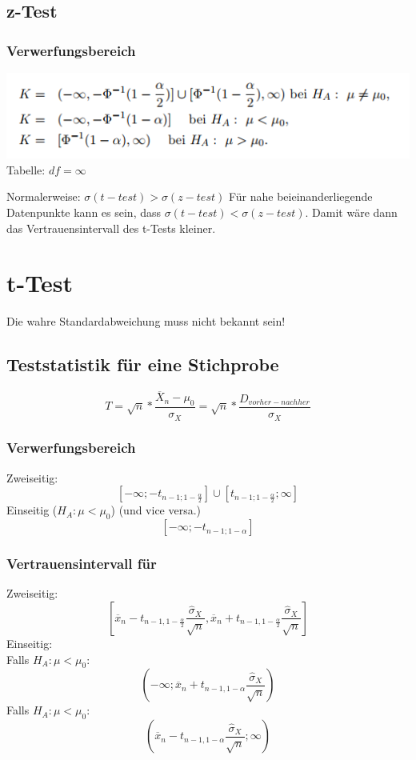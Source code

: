\documentclass{article}
\begin{document}
\begin{multicols*}{3}
      \subsection{z-Test}
      \subsubsection{Verwerfungsbereich}
      \includegraphics[scale=0.4, angle=0]{z-verwerf}
      \\Tabelle: $df = \infty$

      Normalerweise: $\sigma(t-test) > \sigma(z-test)$
      Für nahe beieinanderliegende Datenpunkte kann es sein, dass
      $\sigma(t-test) < \sigma(z-test)$. Damit wäre dann das Vertrauensintervall des t-Tests kleiner.
      \section{t-Test}

      Die wahre Standardabweichung muss nicht bekannt sein!
      \subsection{Teststatistik für eine Stichprobe}

      $$T=\sqrt{n}*\frac{\overline{X}_n-\mu_0}{\sigma_X}=\sqrt{n}*\frac{D_{vorher-nachher}}{\sigma_X}$$

      \subsubsection{Verwerfungsbereich}
      Zweiseitig:
      $$[-\infty;-t_{n-1;1-\frac{\alpha}{2}}]\cup [t_{n-1;1-\frac{\alpha}{2}};\infty]$$
      Einseitig ($H_A:\mu<\mu_0$) (und vice versa.)
      $$[-\infty;-t_{n-1;1-\alpha}]$$

      \subsubsection{Vertrauensintervall für \mu}
      Zweiseitig:
      $$[\overline{x} _n -t_{n-1,1-\frac{\alpha}{2}} \frac{\hat{\sigma}_X}{\sqrt{n}},\overline{x} _n +t_{n-1,1-\frac{\alpha}{2}} \frac{\hat{\sigma} _X}{\sqrt{n}}]$$
      Einseitig: \\
      Falls $H_A:\mu < \mu _0:$
      $$(-\infty; \overline{x} _n + t_{n-1,1-\alpha} \frac{\hat{\sigma}_X}{\sqrt{n}})$$
      Falls $H_A:\mu < \mu _0:$
      $$(\overline{x} _n - t_{n-1,1-\alpha} \frac{\hat{\sigma}_X}{\sqrt{n}}; \infty)$$


\end{multicols*}
\end{document}
